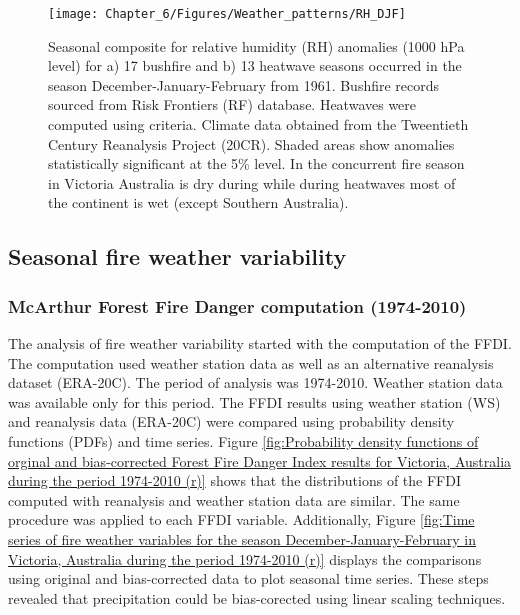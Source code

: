 \begin{figure}[h]
\noindent \begin{centering}
\texttt{[image: Chapter\_6/Figures/Weather\_patterns/RH\_DJF]}
\par\end{centering}

\caption[Seasonal composite for relative humidity (RH) anomalies (1000 hPa
level) for a) 17 bushfire and b) 13 heatwave seasons occurred in the
season December-January-February from 1961]{Seasonal composite for relative humidity (RH) anomalies (1000 hPa
level) for a) 17 bushfire and b) 13 heatwave seasons occurred in the
season December-January-February from 1961. Bushfire
records sourced from Risk Frontiers (RF) database. Heatwaves were
computed using \citet{Pezza2012} criteria. Climate data obtained
from the Tweentieth Century Reanalysis Project (20CR). Shaded areas
show anomalies statistically significant at the 5\% level. In the
concurrent fire season in Victoria Australia is dry during while during
heatwaves most of the continent is wet (except Southern Australia).\label{fig:Relative humidity anomalies (1000 hPa level) of bushfire and heatwave seasons in December-January-February for the period 1961=0020132011 (r)}}
\end{figure}



\subsection{Seasonal fire weather variability}


\subsubsection{McArthur Forest Fire Danger computation (1974-2010)}

The analysis of fire weather variability started with the computation
of the FFDI. The computation used weather station data as well as
an alternative reanalysis dataset (ERA-20C). The period of analysis
was 1974-2010. Weather station data was available only for this period.
The FFDI results using weather station (WS) and reanalysis data (ERA-20C)
were compared using probability density functions (PDFs) and time
series. Figure \ref{fig:Probability density functions of orginal and bias-corrected Forest Fire Danger Index results for Victoria, Australia during the period 1974-2010 (r)}
shows that the distributions of the FFDI computed with reanalysis
and weather station data are similar. The same procedure was applied
to each FFDI variable. Additionally, Figure \ref{fig:Time series of fire weather variables for the season December-January-February in Victoria, Australia during the period 1974-2010 (r)}
displays the comparisons using original and bias-corrected data to
plot seasonal time series. These steps revealed that precipitation
could be bias-corected using linear scaling techniques. 

